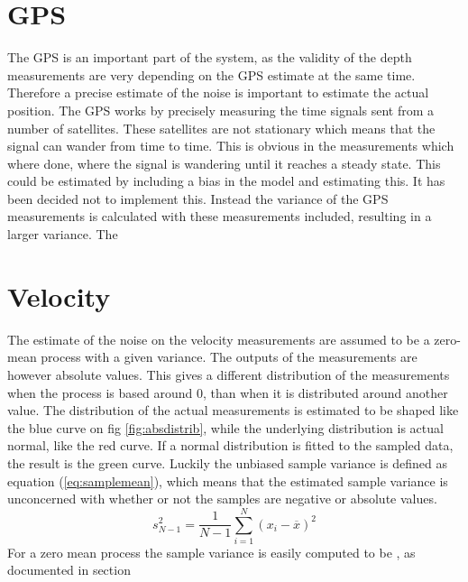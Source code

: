 \section{GPS}
The GPS is an important part of the system, as the validity of the depth measurements are very depending on the GPS estimate at the same time. Therefore a precise estimate of the noise is important to estimate the actual position. The GPS works by precisely measuring the time signals sent from a number of satellites. These satellites are not stationary which means that the signal can wander from time to time. This is obvious in the measurements which where done, where the signal is wandering until it reaches a steady state. This could be estimated by including a bias in the model and estimating this. It has been decided not to implement this.  Instead the variance of the GPS measurements is calculated with these measurements included, resulting in a larger variance.
The 

\section{Velocity}
The estimate of the noise on the velocity measurements are assumed to be a zero-mean process with a given variance. The outputs of the measurements are however absolute values. This gives a different distribution of the measurements when the process is based around 0, than when it is distributed around another value. The distribution of the actual measurements is estimated to be shaped like the blue curve on fig \ref{fig:absdistrib}, while the underlying distribution is actual normal, like the red curve. If a normal distribution is fitted to the sampled data, the result is the green curve. Luckily the unbiased sample variance is defined as equation (\ref{eq:samplemean}), which means that the estimated sample variance is unconcerned with whether or not the samples are negative or absolute values.
\begin{equation}
s^2_{N-1} = \frac{1}{N-1} \sum^N_{i=1}(x_i-\overline{x})^2
\end{equation}
\label{eq:samplemean} For a zero mean process the sample variance is easily computed to be , as documented in section 

\begin{figure}[h]
\end{figure}

